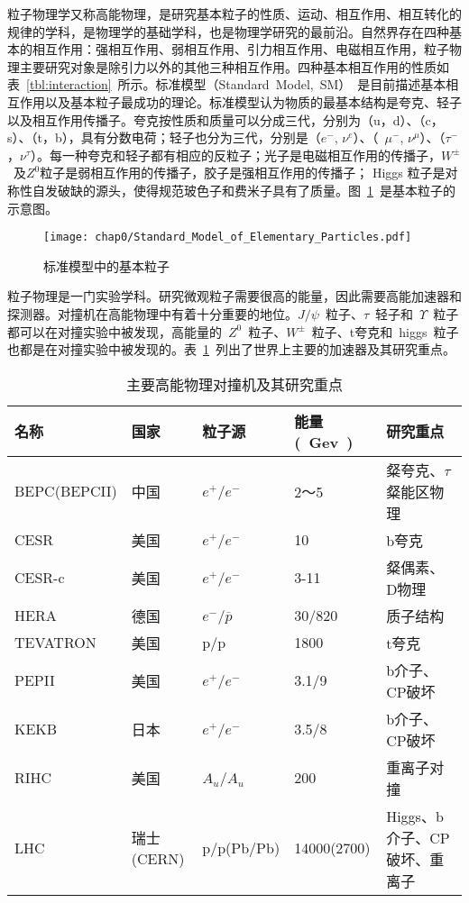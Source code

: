 粒子物理学又称高能物理，是研究基本粒子的性质、运动、相互作用、相互转化的规律的学科，是物理学的基础学科，也是物理学研究的最前沿\cite{cite2:zhang}。自然界存在四种基本的相互作用：强相互作用、弱相互作用、引力相互作用、电磁相互作用，粒子物理主要研究对象是除引力以外的其他三种相互作用。四种基本相互作用的性质如表~\ref{tbl:interaction}~所示。标准模型（Standard~Model,~SM）~是目前描述基本相互作用以及基本粒子最成功的理论\cite{cite3}。标准模型认为物质的最基本结构是夸克、轻子以及相互作用传播子。夸克按性质和质量可以分成三代，分别为（u，d）、（c，s）、（t，b），具有分数电荷；轻子也分为三代，分别是（$e^{-}$,  $\nu^{e}$）、（~$\mu^{-}$, $\nu^{\mu}$）、（$\tau^{-}$，$\nu^{\tau}$）。每一种夸克和轻子都有相应的反粒子；光子是电磁相互作用的传播子，$W^{\pm}$~及$Z^{0}$粒子是弱相互作用的传播子，胶子是强相互作用的传播子； Higgs 粒子是对称性自发破缺的源头，使得规范玻色子和费米子具有了质量。图~\ref{fig:standard_model_particle}~是基本粒子的示意图。
\begin{figure}[!h]
  \centering
  \texttt{[image: chap0/Standard\_Model\_of\_Elementary\_Particles.pdf]}
  \caption{标准模型中的基本粒子}
  \label{fig:standard_model_particle}
\end{figure}

粒子物理是一门实验学科。研究微观粒子需要很高的能量，因此需要高能加速器和探测器。对撞机在高能物理中有着十分重要的地位。$J/\psi$~粒子、$\tau$~轻子和~$\Upsilon$~粒子都可以在对撞实验中被发现，高能量的~$Z^{0}$~粒子、$W^{\pm}$~粒子、t夸克和~higgs~粒子也都是在对撞实验中被发现的。表~\ref{tbl:collider-accelerator}~列出了世界上主要的加速器及其研究重点。
\begin{table}[h]
    \centering
    \caption{\label{tbl:collider-accelerator} 主要高能物理对撞机及其研究重点}
    \footnotesize
    \begin{tabular}{lllll}
        \hline
        名称& 国家& 粒子源& 能量(~Gev~)& 研究重点\\
        \hline
        BEPC(BEPCII)& 中国& $e^{+}$/$e^{-}$& 2～5& 粲夸克、$\tau$粲能区物理 \\
        CESR& 美国& $e^{+}$/$e^{-}$& 10& b夸克 \\
        CESR-c& 美国& $e^{+}$/$e^{-}$& 3-11& 粲偶素、D物理 \\
        HERA& 德国&  $e^{-}$/$\overline{p}$&30/820& 质子结构\\
        TEVATRON& 美国& p/p&1800& t夸克\\
        PEPII& 美国& $e^{+}$/$e^{-}$& 3.1/9& b介子、CP破坏\\
        KEKB& 日本&   $e^{+}$/$e^{-}$& 3.5/8& b介子、CP破坏\\
        RIHC& 美国& $A_{u}$/$A_{u}$& 200& 重离子对撞\\
        LHC& 瑞士(CERN)& p/p(Pb/Pb)& 14000(2700)& Higgs、b介子、CP破坏、重离子\\
        \hline
    \end{tabular}
\end{table}



